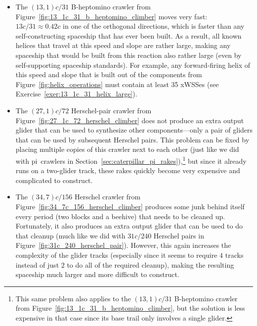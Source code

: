 \begin{itemize}
	\item The $(13,1)c/31$ B-heptomino crawler from Figure~\ref{fig:13_1c_31_b_heptomino_climber} moves very fast: $13c/31 \approx 0.42c$ in one of the orthogonal directions, which is faster than any self-constructing spaceship that has ever been built. As a result, all known helices that travel at this speed and slope are rather large, making any spaceship that would be built from this reaction also rather large (even by self-supporting spaceship standards). For example, any forward-firing helix of this speed and slope that is built out of the components from Figure~\ref{fig:helix_operations} must contain at least 35 xWSSes (see Exercise~\ref{exer:13_1c_31_helix_large}).\smallskip
	
	\item The $(27,1)c/72$ Herschel-pair crawler from Figure~\ref{fig:27_1c_72_herschel_climber} does not produce an extra output glider that can be used to synthesize other components---only a pair of gliders that can be used by subsequent Herschel pairs. This problem can be fixed by placing multiple copies of this crawler next to each other (just like we did with pi~crawlers in Section~\ref{sec:caterpillar_pi_rakes}),\footnote{This same problem also applies to the $(13,1)c/31$ B-heptomino crawler from Figure~\ref{fig:13_1c_31_b_heptomino_climber}, but the solution is less expensive in that case since its base trail only involves a single glider.} but since it already runs on a two-glider track, these rakes quickly become very expensive and complicated to construct.\smallskip
	
	\item The $(34,7)c/156$ Herschel crawler from Figure~\ref{fig:34_7c_156_herschel_climber} produces some junk behind itself every period (two blocks and a beehive) that needs to be cleaned up. Fortunately, it also produces an extra output glider that can be used to do that cleanup (much like we did with $31c/240$ Herschel pairs in Figure~\ref{fig:31c_240_herschel_pair}). However, this again increases the complexity of the glider tracks (especially since it seems to require $4$ tracks instead of just $2$ to do all of the required cleanup), making the resulting spaceship much larger and more difficult to construct.\smallskip
\end{itemize}


